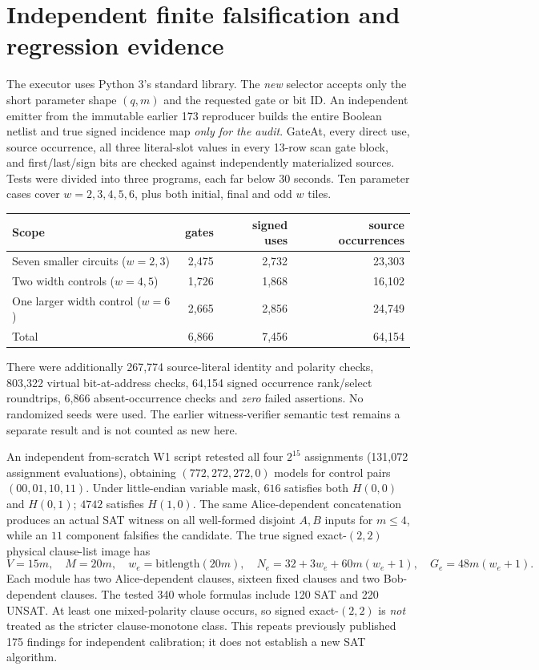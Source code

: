 \documentclass[11pt]{article}
\begin{document}
\section{Independent finite falsification and regression evidence}
The executor uses Python 3's standard library. The \emph{new} selector accepts only the short parameter shape $(q,m)$ and the requested gate or bit ID. An independent emitter from the immutable earlier 173 reproducer builds the entire Boolean netlist and true signed incidence map \emph{only for the audit}. GateAt, every direct use, source occurrence, all three literal-slot values in every 13-row scan gate block, and first/last/sign bits are checked against independently materialized sources. Tests were divided into three programs, each far below 30 seconds. Ten parameter cases cover $w=2,3,4,5,6$, plus both initial, final and odd $w$ tiles.
\begin{center}\small
\begin{tabular}{lrrr}
\toprule
Scope& gates & signed uses & source occurrences\\\midrule
Seven smaller circuits ($w=2,3$)&2,475&2,732&23,303\\
Two width controls ($w=4,5$)&1,726&1,868&16,102\\
One larger width control ($w=6$)&2,665&2,856&24,749\\\midrule
Total&6,866&7,456&64,154\\\bottomrule
\end{tabular}
\end{center}
There were additionally 267,774 source-literal identity and polarity checks, 803,322 virtual bit-at-address checks, 64,154 signed occurrence rank/select roundtrips, 6,866 absent-occurrence checks and \emph{zero} failed assertions. No randomized seeds were used. The earlier witness-verifier semantic test remains a separate result and is not counted as new here.

An independent from-scratch W1 script retested all four $2^{15}$ assignments (131,072 assignment evaluations), obtaining $(772,272,272,0)$ models for control pairs $(00,01,10,11)$. Under little-endian variable mask, $616$ satisfies both $H(0,0)$ and $H(0,1)$; $4742$ satisfies $H(1,0)$. The same Alice-dependent concatenation produces an actual SAT witness on all well-formed disjoint $A,B$ inputs for $m\le4$, while an $11$ component falsifies the candidate. The true signed exact-$(2,2)$ physical clause-list image has
\[
 V=15m,\quad M=20m,\quad w_e=\mathrm{bitlength}(20m),\quad N_e=32+3w_e+60m(w_e+1),\quad G_e=48m(w_e+1).
\]
Each module has two Alice-dependent clauses, sixteen fixed clauses and two Bob-dependent clauses. The tested 340 whole formulas include 120 SAT and 220 UNSAT. At least one mixed-polarity clause occurs, so signed exact-$(2,2)$ is \emph{not} treated as the stricter clause-monotone class. This repeats previously published 175 findings for independent calibration; it does not establish a new SAT algorithm.
\end{document}
